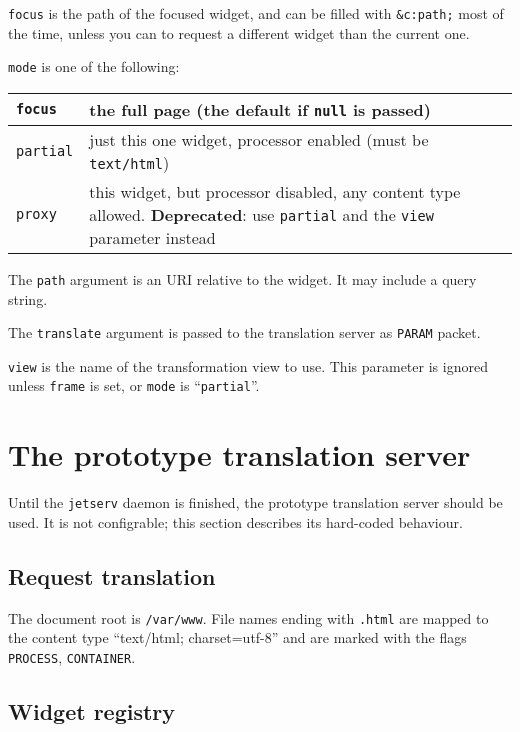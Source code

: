 \documentclass[a4paper,12pt]{article}
\begin{document}
\texttt{focus} is the path of the focused widget, and can be filled
with \texttt{\&c:path;} most of the time, unless you can to request a
different widget than the current one.

\texttt{mode} is one of the following:

\begin{tabular}{|l|p{12cm}|}
\hline

\texttt{focus} & the full page (the default if \texttt{null} is
passed) \\

\hline

\texttt{partial} & just this one widget, processor enabled (must be
\texttt{text/html}) \\

\hline
\texttt{proxy} & this widget, but processor disabled, any content type
allowed.
\textbf{Deprecated}: use \texttt{partial} and the \texttt{view}
parameter instead \\
\hline
\end{tabular}

The \texttt{path} argument is an URI relative to the widget.  It may
include a query string.

The \texttt{translate} argument is passed to the translation server as
\texttt{PARAM} packet.

\texttt{view} is the name of the transformation view to use.  This
parameter is ignored unless \texttt{frame} is set, or \texttt{mode} is
``\texttt{partial}''.


\section{The prototype translation server}

Until the \texttt{jetserv} daemon is finished, the prototype
translation server should be used.  It is not configrable; this
section describes its hard-coded behaviour.

\subsection{Request translation}

The document root is \texttt{/var/www}.  File names ending with
\texttt{.html} are mapped to the content type ``text/html;
charset=utf-8'' and are marked with the flags \texttt{PROCESS},
\texttt{CONTAINER}.

\subsection{Widget registry}
\end{document}
